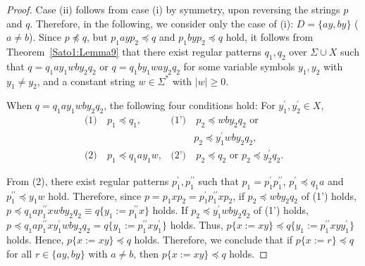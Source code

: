 \begin{proof}
{\color{red}
Case \textrm{(ii)} follows from case \textrm{(i)} by symmetry, upon reversing the strings $p$ and $q$.
}
Therefore, in the following, we consider only the case of \textrm{(i)}: $D=\{ ay, by \}$ ($a \not= b$).
%
%
%
{\color{red} Since $p\not\preceq q$, but $p_{1}ayp_{2}\preceq q$ and $p_{1}byp_{2}\preceq q$ hold, it follows from Theorem~\ref{Sato1:Lemma9} that
there exist regular patterns $q_{1},q_{2}$ {\color{red}over} $\Sigma\cup X$ such that $q=q_{1}ay_{1}wby_{2}q_{2}$ or $q=q_{1}by_{1}way_{2}q_{2}$ for some variable symbols $y_{1},y_{2}$ with $y_{1} \not= y_{2}$, and a constant string $w\in \Sigma^{*}$ with $|w|\geq 0$.
}

When $q=q_{1}ay_{1}wby_{2}q_{2}$, the following four conditions hold: For $y_{1}^{\prime}, y_{2}^{\prime}\in X$,
\begin{align*}
\textrm{(1)} & ~p_{1} \preceq q_{1}, & \textrm{(1')} & ~p_{2} \preceq wby_{2}q_{2} \mbox{~or~}\\
& & & p_{2} \preceq y_{1}^{\prime}wby_{2}q_{2},\\
\textrm{(2)} & ~p_{1} \preceq q_{1}ay_{1}w, & \textrm{(2')} & ~p_{2} \preceq q_{2} \mbox{~or~}
p_{2} \preceq y_{2}^{\prime}q_{2}.
\end{align*}

From (2), there exist regular patterns $p_{1}^{\prime},p_{1}^{\prime\prime}$ such that $p_{1}=p_{1}^{\prime}p_{1}^{\prime\prime}$, $p_{1}^{\prime} \preceq q_{1}a$ and $p_{1}^{\prime\prime} \preceq y_{1}w$ hold.
Therefore, since $p=p_{1}xp_{2}=p_{1}^{\prime}p_{1}^{\prime\prime}xp_{2}$,
if $p_{2} \preceq wby_{2}q_{2}$ of (1') holds, 
$p\preceq q_{1}ap_{1}^{\prime\prime}xwby_{2}q_{2}\equiv q \{ y_{1} := p_{1}^{\prime\prime}x \}$ holds.
If $p_2\preceq y_{1}^{\prime}wby_{2}q_{2}$ of (1') holds, $p\preceq q_{1}ap_{1}^{\prime\prime}xy_{1}^{\prime}wby_{2}q_{2}=q \{ y_{1} := p_{1}^{\prime\prime}xy_{1}^{\prime} \}$ holds.
Thus, $p\{x := xy\} \preceq q \{ y_{1} := p_{1}^{\prime\prime}xyy_{1}^{\prime} \}$ holds.
%
%
{\color{red} Hence, $p\{x:=xy\}\preceq q$ holds.}
Therefore, we conclude that if $p \{ x := r \} \preceq q$ for all $r \in \{ ay, by \}$ with $a \not= b$, then $p \{ x := xy \} \preceq q$ holds.
\end{proof}
